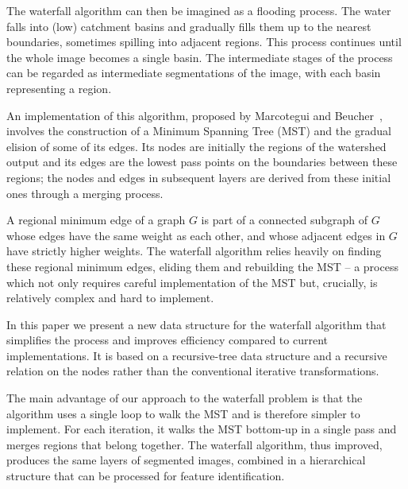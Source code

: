 \documentclass{ouclprgsc}
\begin{document}
The waterfall algorithm can then be imagined
as a flooding process. The water falls into (low) catchment basins and
gradually fills them up to the nearest boundaries, sometimes spilling
into adjacent regions. This process continues until the whole image
becomes a single basin. The intermediate stages of the process can be
regarded as intermediate segmentations of the image, with each basin
representing a region.

An implementation of this algorithm, proposed by Marcotegui and
Beucher~\cite{marcotegui}, involves the construction of a Minimum
Spanning Tree (MST) and the gradual elision of some of its edges.  Its
nodes are initially the regions of the watershed output and its edges
are the lowest pass points on the boundaries between these regions;
the nodes and edges in subsequent layers are derived from these
initial ones through a merging process.

A regional minimum edge of a graph $G$ is part of a connected subgraph
of $G$ whose edges have the same weight as each other, and whose
adjacent edges in $G$ have strictly higher weights. The waterfall
algorithm relies heavily on finding these regional minimum edges,
eliding them and rebuilding the MST -- a process which not only
requires careful implementation of the MST but, crucially, is
relatively complex and hard to implement.

\iffalse
The collection of regional minimum edges of a graph $G$ is a connected
subgraph of $G$ whose edges have the same weight as each other, and
whose adjacent edges in $G$ have strictly higher weights. The
waterfall algorithm relies heavily on finding these regional minimum
edges, eliding them and rebuilding the MST -- a process which not only
requires careful implementation of the MST but, more importantly, is
relatively complex and hard to implement.
\fi

In this paper we present a new data structure for the waterfall
algorithm that simplifies the process and improves efficiency compared
to current implementations. It is based on a recursive-tree data
structure and a recursive relation on the nodes rather than the
conventional iterative transformations.

The main advantage of our approach to the waterfall problem is that
the algorithm uses a single loop to walk the MST and is therefore
simpler to implement. For each iteration, it walks the MST bottom-up
in a single pass and merges regions that belong together. The
waterfall algorithm, thus improved, produces the same layers of
segmented images, combined in a hierarchical structure that can be
processed for feature identification.
\end{document}

